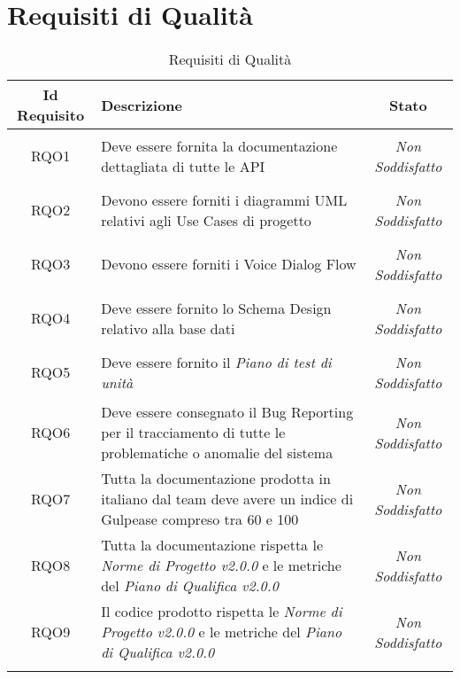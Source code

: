 \section{Requisiti di Qualità}
\normalsize
\begin{longtable}{|c|>{\centering}m{7cm}|c|}
	\hline 
	\textbf{Id Requisito} & \textbf{Descrizione} & \textbf{Stato}\\
	\hline
	\endhead
	\hypertarget{RQO1}{RQO1} & Deve essere fornita la documentazione dettagliata di tutte le API & \textit{Non Soddisfatto}\\ \hline
	
	\hypertarget{RQO2}{RQO2} & Devono essere forniti i diagrammi UML relativi agli Use Cases di progetto & \textit{Non Soddisfatto}\\ \hline
	
	\hypertarget{RQO3}{RQO3} & Devono essere forniti i Voice Dialog Flow & \textit{Non Soddisfatto}\\ \hline
	
	\hypertarget{RQO4}{RQO4} & Deve essere fornito lo Schema Design relativo alla base dati & \textit{Non Soddisfatto}\\ \hline
	
	\hypertarget{RQO5}{RQO5} & Deve essere fornito il \textit{Piano di test di unità} & \textit{Non Soddisfatto}\\ \hline
	
	\hypertarget{RQO6}{RQO6} & Deve essere consegnato il Bug Reporting per il tracciamento di tutte le problematiche o anomalie del sistema & \textit{Non Soddisfatto}\\ \hline
	
	\hypertarget{RQO7}{RQO7} & Tutta la documentazione prodotta in italiano dal team deve avere un indice di Gulpease compreso tra 60 e 100 & \textit{Non Soddisfatto}\\ \hline
	
	\hypertarget{RQO8}{RQO8} & Tutta la documentazione rispetta le \textit{Norme di Progetto v2.0.0} e le metriche del \textit{Piano di Qualifica v2.0.0} & \textit{Non Soddisfatto}\\ \hline
	
	\hypertarget{RQO9}{RQO9} & Il codice prodotto rispetta le \textit{Norme di Progetto v2.0.0} e le metriche del \textit{Piano di Qualifica v2.0.0} & \textit{Non Soddisfatto}\\ \hline
	
	\caption[Requisiti di Qualità]{Requisiti di Qualità}
	\label{tabella:req2}
\end{longtable}
\clearpage

